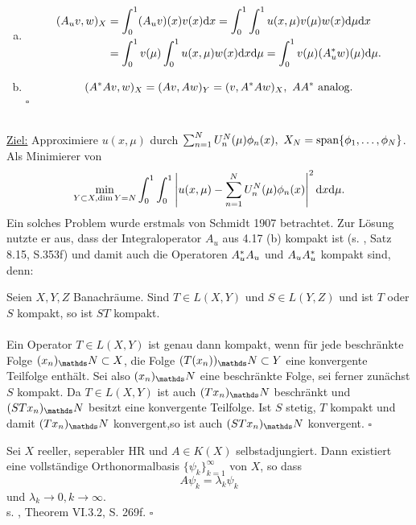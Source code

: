 \\
\begin{enumerate}[(b)]
	\item 
	\begin{align*}
	(A_uv,w)_X &= \int_{0}^{1} (A_uv)(x)v(x)\mathrm{d} x = \int_0^1\int_0^1 u(x,\mu)v(\mu)w(x)\mathrm{d}\mu\mathrm{d} x\\
	&= \int_0^1 v(\mu) \int_0^1 u(x,\mu)w(x)\mathrm{d} x\mathrm{d} \mu = \int_0^1 v(\mu)(A_u^\ast w)(\mu)\mathrm{d} \mu.
	\end{align*}
	\item
	\[
	(A^\ast A v,w)_X = (Av,Aw)_Y = (v,A^\ast A w)_X, ~AA^\ast \text{ analog.}
	\]
	\hfill $\square$
\end{enumerate}

\\
\uline{Ziel:} Approximiere $u(x,\mu)$ durch $\sum_{n=1}^{N}U_n^N(\mu)\phi_n(x),~X_N=\operatorname{span}\{\phi_1, \dots ,\phi_N\}$.
Als Minimierer von 
\[
\min\limits_{Y\subset X,\dim Y =N} \int_0^1\int_0^1\left\vert u(x,\mu)-\sum_{n=1}^{N}U_n^N(\mu)\phi_n(x)\right\vert^2\mathrm{d} x\mathrm{d} \mu.
\]
Ein solches Problem wurde erstmals von Schmidt 1907 betrachtet.
Zur Lösung nutzte er aus, dass der Integraloperator $A_u$ aus 4.17 (b) kompakt ist (s. \cite{Alt12}, Satz 8.15, S.353f) und damit auch die Operatoren $A_u^\ast A_u$ und $A_uA_u^\ast$ kompakt sind, denn:

Seien $X,Y,Z$ Banachräume.
Sind $T\in L(X,Y)$ und $S\in L(Y,Z)$ und ist $T$ oder $S$ kompakt, so ist $ST$ kompakt.\\

\\
Ein Operator $T\in L(X,Y)$ ist genau dann kompakt, wenn für jede beschränkte Folge $(x_n)_\N\subset X$, die Folge $(T(x_n))_\N\subset Y$ eine konvergente Teilfolge enthält.
Sei also $(x_n)_\N$ eine beschränkte Folge, sei ferner zunächst $S$ kompakt.
Da $T\in L(X,Y)$ ist auch $(Tx_n)_\N$ beschränkt und $(STx_n)_\N$ besitzt eine konvergente Teilfolge.
Ist $S$ stetig, $T$ kompakt und damit $(Tx_n)_\N$ konvergent,so ist auch $(STx_n)_\N$ konvergent.
\hfill $\square$

Sei $X$ reeller, seperabler HR und $A\in K(X)$ selbstadjungiert.
Dann existiert eine vollständige Orthonormalbasis $\{\psi_k\}_{k=1}^{\infty}$ von $X$, so dass
\[
A\psi_k = \lambda_k\psi_k
\]
und $\lambda_k\to 0,k\to \infty$.\\

 s. \cite{Wer07}, Theorem VI.3.2, S. 269f.
\hfill $\square$\\

